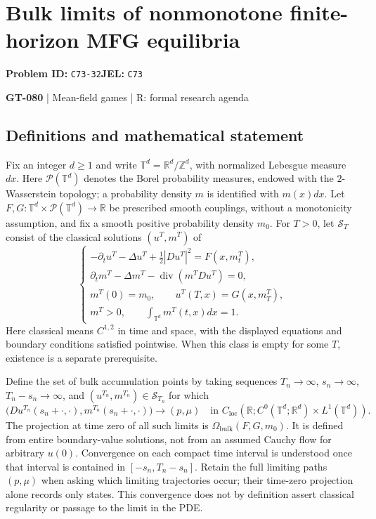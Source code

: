 \documentclass[11pt,a4paper]{article}
\begin{document}
\section*{Bulk limits of nonmonotone finite-horizon MFG equilibria}
\textbf{Problem ID:} \texttt{C73-32}\quad \textbf{JEL:} \texttt{C73}\par
\label{problem:OP-0210}
\label{game:GT-080}
{\sffamily\small\color{muted}
{\small\textbf{GT-080} | Mean-field games | R: formal research agenda\par}
\par}
\subsection*{Definitions and mathematical statement}
Fix an integer $d\geq1$ and write $\mathbb T^d=\mathbb R^d/\mathbb Z^d$, with normalized Lebesgue measure $dx$. Here $\mathcal P(\mathbb T^d)$ denotes the Borel probability measures, endowed with the $2$-Wasserstein topology; a probability density $m$ is identified with $m(x)dx$.
Let $F,G:\mathbb T^d\times\mathcal P(\mathbb T^d)\to\mathbb R$ be prescribed smooth couplings, without a monotonicity assumption, and fix a smooth positive probability density $m_0$. For $T>0$, let $\mathcal S_T$ consist of the classical solutions $(u^T,m^T)$ of
\[
 \begin{cases}
 -\partial_t u^T-\Delta u^T+\tfrac12|Du^T|^2=F(x,m_t^T),\\
 \partial_t m^T-\Delta m^T-\operatorname{div}(m^T Du^T)=0,\\
 m^T(0)=m_0,\qquad u^T(T,x)=G(x,m_T^T),\\
 m^T>0,\qquad\displaystyle\int_{\mathbb T^d}m^T(t,x)dx=1.
 \end{cases}
\]
Here classical means $C^{1,2}$ in time and space, with the displayed equations and boundary conditions satisfied pointwise. When this class is empty for some $T$, existence is a separate prerequisite.

Define the set of bulk accumulation points by taking sequences $T_n\to\infty$, $s_n\to\infty$, $T_n-s_n\to\infty$, and $(u^{T_n},m^{T_n})\in\mathcal S_{T_n}$ for which
\[
 \big(Du^{T_n}(s_n+\cdot,\cdot),m^{T_n}(s_n+\cdot,\cdot)\big)
 \longrightarrow (p,\mu)
 \quad\text{in }C_{\mathrm{loc}}(\mathbb R;C^0(\mathbb T^d;\mathbb R^d)\times L^1(\mathbb T^d)).
\]
The projection at time zero of all such limits is $\Omega_{\mathrm{bulk}}(F,G,m_0)$. It is defined from entire boundary-value solutions, not from an assumed Cauchy flow for arbitrary $u(0)$. Convergence on each compact time interval is understood once that interval is contained in $[-s_n,T_n-s_n]$. Retain the full limiting paths $(p,\mu)$ when asking which limiting trajectories occur; their time-zero projection alone records only states. This convergence does not by definition assert classical regularity or passage to the limit in the PDE.
\end{document}
